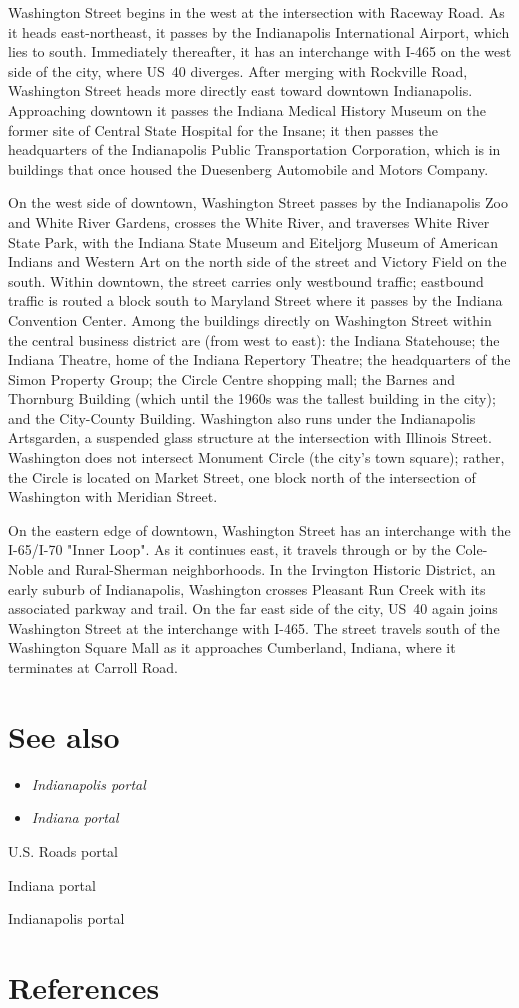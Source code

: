 Washington Street begins in the west at the intersection with Raceway
Road. As it heads east-northeast, it passes by the Indianapolis
International Airport, which lies to south. Immediately thereafter, it
has an interchange with I-465 on the west side of the city, where US~40
diverges. After merging with Rockville Road, Washington Street heads
more directly east toward downtown Indianapolis. Approaching downtown it
passes the Indiana Medical History Museum on the former site of Central
State Hospital for the Insane; it then passes the headquarters of the
Indianapolis Public Transportation Corporation, which is in buildings
that once housed the Duesenberg Automobile and Motors Company.

On the west side of downtown, Washington Street passes by the
Indianapolis Zoo and White River Gardens, crosses the White River, and
traverses White River State Park, with the Indiana State Museum and
Eiteljorg Museum of American Indians and Western Art on the north side
of the street and Victory Field on the south. Within downtown, the
street carries only westbound traffic; eastbound traffic is routed a
block south to Maryland Street where it passes by the Indiana Convention
Center. Among the buildings directly on Washington Street within the
central business district are (from west to east): the Indiana
Statehouse; the Indiana Theatre, home of the Indiana Repertory Theatre;
the headquarters of the Simon Property Group; the Circle Centre shopping
mall; the Barnes and Thornburg Building (which until the 1960s was the
tallest building in the city); and the City-County Building. Washington
also runs under the Indianapolis Artsgarden, a suspended glass structure
at the intersection with Illinois Street. Washington does not intersect
Monument Circle (the city's town square); rather, the Circle is located
on Market Street, one block north of the intersection of Washington with
Meridian Street.

On the eastern edge of downtown, Washington Street has an interchange
with the I-65/I-70 "Inner Loop". As it continues east, it travels
through or by the Cole-Noble and Rural-Sherman neighborhoods. In the
Irvington Historic District, an early suburb of Indianapolis, Washington
crosses Pleasant Run Creek with its associated parkway and trail. On the
far east side of the city, US~40 again joins Washington Street at the
interchange with I-465. The street travels south of the Washington
Square Mall as it approaches Cumberland, Indiana, where it terminates at
Carroll Road.

\section{See also}\label{see-also}

\begin{itemize}
\item
  \emph{Indianapolis portal}
\item
  \emph{Indiana portal}
\end{itemize}

U.S. Roads portal

Indiana portal

Indianapolis portal

\section{References}\label{references}
